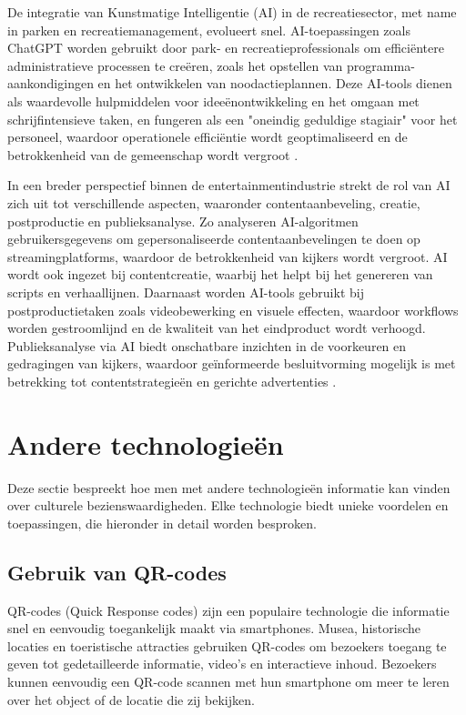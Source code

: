 De integratie van Kunstmatige Intelligentie (AI) in de recreatiesector, met name in parken en recreatiemanagement, evolueert snel. AI-toepassingen zoals ChatGPT worden gebruikt door park- en recreatieprofessionals om efficiëntere administratieve processen te creëren, zoals het opstellen van programma-aankondigingen en het ontwikkelen van noodactieplannen. Deze AI-tools dienen als waardevolle hulpmiddelen voor ideeënontwikkeling en het omgaan met schrijfintensieve taken, en fungeren als een "oneindig geduldige stagiair" voor het personeel, waardoor operationele efficiëntie wordt geoptimaliseerd en de betrokkenheid van de gemeenschap wordt vergroot \autocite{ParksRecAI2023}.

In een breder perspectief binnen de entertainmentindustrie strekt de rol van AI zich uit tot verschillende aspecten, waaronder contentaanbeveling, creatie, postproductie en publieksanalyse. Zo analyseren AI-algoritmen gebruikersgegevens om gepersonaliseerde contentaanbevelingen te doen op streamingplatforms, waardoor de betrokkenheid van kijkers wordt vergroot. AI wordt ook ingezet bij contentcreatie, waarbij het helpt bij het genereren van scripts en verhaallijnen. Daarnaast worden AI-tools gebruikt bij postproductietaken zoals videobewerking en visuele effecten, waardoor workflows worden gestroomlijnd en de kwaliteit van het eindproduct wordt verhoogd. Publieksanalyse via AI biedt onschatbare inzichten in de voorkeuren en gedragingen van kijkers, waardoor geïnformeerde besluitvorming mogelijk is met betrekking tot contentstrategieën en gerichte advertenties \autocite{WebisoftEntAI}.

\section{Andere technologieën}
Deze sectie bespreekt hoe men met andere technologieën informatie kan vinden over culturele bezienswaardigheden. Elke technologie biedt unieke voordelen en toepassingen, die hieronder in detail worden besproken.

\subsection{Gebruik van QR-codes}
QR-codes (Quick Response codes) zijn een populaire technologie die informatie snel en eenvoudig toegankelijk maakt via smartphones. Musea, historische locaties en toeristische attracties gebruiken QR-codes om bezoekers toegang te geven tot gedetailleerde informatie, video's en interactieve inhoud. Bezoekers kunnen eenvoudig een QR-code scannen met hun smartphone om meer te leren over het object of de locatie die zij bekijken.

